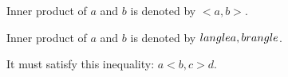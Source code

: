 Inner product of $a$ and $b$ is denoted by $<a, b>$.

Inner product of $a$ and $b$ is denoted by $\\langle a, b \\rangle$.

It must satisfy this inequality: $a < b, c > d$.

